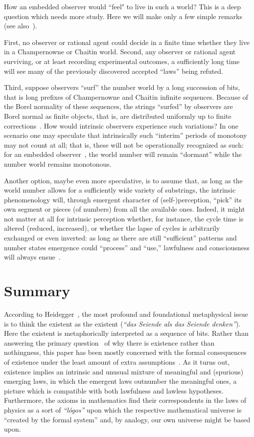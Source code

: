 \documentclass[12pt]{article}
\begin{document}
 How  an embedded observer would  ``feel"  to live in such a world?  This is a deep question which needs  more study. Here we will make only a few simple remarks (see also~\cite{calude1999islawful}).


First, no observer or rational agent could decide in a finite time whether they live in a Champernowne or Chaitin world.
Second, any observer or rational agent surviving, or at least recording experimental outcomes, a sufficiently long time
will see many of the previously discovered accepted ``laws'' being refuted.

Third, suppose observers ``surf'' the number world by a long succession of bits,
that is long prefixes of  Champernowne  and Chaitin infinite sequences. Because of the Borel normality of these sequences, the strings ``surfed'' by observers are
Borel normal  as finite objects,
that is, are distributed uniformly up to finite corrections~\cite{DBLP:conf/dlt/Calude93}.
How would intrinsic observers experience such variations?
In one scenario one may speculate that intrinsically such ``interim'' periods of monotony may not count at all; that is,
these will not be operationally recognized as such:
for an embedded observer~\cite{toffoli:79,svozil-94}, the  world number will remain ``dormant'' while the number world remains monotonous.

Another option, maybe even more speculative, is to assume that, as long as the world number allows for a sufficiently wide variety of substrings,
the intrinsic
phenomenology will, through emergent character of (self-)perception, ``pick'' its own segment or pieces (of numbers) from all the available ones.
Indeed, it might not matter at all for intrinsic perception whether, for instance, the cycle time is altered (reduced, increased),
or whether the lapse of cycles is arbitrarily exchanged or even inverted:
as long as there are still ``sufficient'' patterns and number states emergence could ``process'' and ``use,''
lawfulness and consciousness will always ensue~\cite{permutationcity}.


\section{Summary}
\label{2018-was-secsum}
According to Heidegger~\cite{Heidegger-1929},
the most profound and foundational
metaphysical issue is to think the existent as the existent
({\em ``das Seiende als das Seiende denken''}).
Here the existent is metaphorically interpreted as
a sequence of bits.
Rather than answering the primary question~\cite{Heidegger-1935} of why there
is existence rather than nothingness,
this paper has  been mostly concerned with the formal consequences of existence under
 the least amount of extra assumptions~\cite{jaynes}.
As it turns out, existence implies an intrinsic and unusual mixture of meaningful and (spurious) emerging laws, in which
the emergent laws outnumber the meaningful ones, a picture which is compatible with  both lawfulness and lawless hypotheses.
Furthermore,  the axioms in mathematics find their correspondents in the laws of physics  as a sort of {\it ``l\'ogos''} upon which the respective mathematical universe  is ``created by the formal system''  and, by analogy, our own universe might be based upon.
\end{document}
